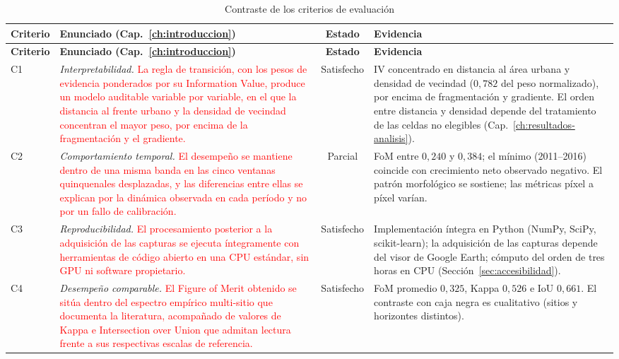\begin{xltabular}{\textwidth}{@{}l X c X@{}}
\caption{Contraste de los criterios de evaluación}\label{tab:hypothesis_validation}\\
\toprule
\textbf{Criterio} & \textbf{Enunciado (Cap.~\ref{ch:introduccion})} & \textbf{Estado} & \textbf{Evidencia} \\
\midrule
\endfirsthead
\toprule
\textbf{Criterio} & \textbf{Enunciado (Cap.~\ref{ch:introduccion})} & \textbf{Estado} & \textbf{Evidencia} \\
\midrule
\endhead
\bottomrule
\endlastfoot
C1 & \textit{Interpretabilidad.} \textcolor{red}{La regla de transición, con los pesos de evidencia ponderados por su Information Value, produce un modelo auditable variable por variable, en el que la distancia al frente urbano y la densidad de vecindad concentran el mayor peso, por encima de la fragmentación y el gradiente.} & Satisfecho & IV concentrado en distancia al área urbana y densidad de vecindad ($0{,}782$ del peso normalizado), por encima de fragmentación y gradiente. El orden entre distancia y densidad depende del tratamiento de las celdas no elegibles (Cap.~\ref{ch:resultados-analisis}). \\
C2 & \textit{Comportamiento temporal.} \textcolor{red}{El desempeño se mantiene dentro de una misma banda en las cinco ventanas quinquenales desplazadas, y las diferencias entre ellas se explican por la dinámica observada en cada período y no por un fallo de calibración.} & Parcial & FoM entre $0{,}240$ y $0{,}384$; el mínimo (2011--2016) coincide con crecimiento neto observado negativo. El patrón morfológico se sostiene; las métricas píxel a píxel varían. \\
C3 & \textit{Reproducibilidad.} \textcolor{red}{El procesamiento posterior a la adquisición de las capturas se ejecuta íntegramente con herramientas de código abierto en una CPU estándar, sin GPU ni software propietario.} & Satisfecho & Implementación íntegra en Python (NumPy, SciPy, scikit-learn); la adquisición de las capturas depende del visor de Google Earth; cómputo del orden de tres horas en CPU (Sección~\ref{sec:accesibilidad}). \\
C4 & \textit{Desempeño comparable.} \textcolor{red}{El Figure of Merit obtenido se sitúa dentro del espectro empírico multi-sitio que documenta la literatura, acompañado de valores de Kappa e Intersection over Union que admitan lectura frente a sus respectivas escalas de referencia.} & Satisfecho & FoM promedio $0{,}325$, Kappa $0{,}526$ e IoU $0{,}661$. El contraste con caja negra es cualitativo (sitios y horizontes distintos). \\
\end{xltabular}

